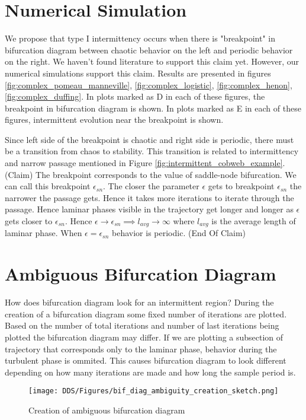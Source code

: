 \section{Numerical Simulation}
We propose that type I intermittency occurs when there is "breakpoint" in bifurcation diagram between chaotic behavior on the left and periodic behavior on the right.
We haven't found literature to support this claim yet.
However, our numerical simulations support this claim.
Results are presented in figures \ref{fig:complex_pomeau_manneville}, \ref{fig:complex_logistic}, \ref{fig:complex_henon}, \ref{fig:complex_duffing}.
In plots marked as D in each of these figures, the breakpoint in bifurcation diagram is shown.
In plots marked as E in each of these figures, intermittent evolution near the breakpoint is shown.
\par
Since left side of the breakpoint is chaotic and right side is periodic, there must be a transition from chaos to stability.
This transition is related to intermittency and narrow passage mentioned in Figure \ref{fig:intermittent_cobweb_example}.
(Claim) The breakpoint corresponds to the value of saddle-node bifurcation.
We can call this breakpoint $\epsilon_{sn}$.
The closer the parameter $\epsilon$ gets to breakpoint $\epsilon_{sn}$ the narrower the passage gets.
Hence it takes more iterations to iterate through the passage.
Hence laminar phases visible in the trajectory get longer and longer as $\epsilon$ gets closer to $\epsilon_{sn}$.
Hence $\epsilon \rightarrow \epsilon_{sn} \implies l_{avg} \rightarrow \infty$ where $l_{avg}$ is the average length of laminar phase.
When $\epsilon = \epsilon_{sn}$ behavior is periodic.
(End Of Claim)

\section{Ambiguous Bifurcation Diagram}
How does bifurcation diagram look for an intermittent region?
During the creation of a bifurcation diagram some fixed number of iterations are plotted.
Based on the number of total iterations and number of last iterations being plotted the bifurcation diagram may differ.
If we are plotting a subsection of trajectory that corresponds only to the laminar phase, behavior during the turbulent phase is ommited.
This causes bifurcation diagram to look different depending on how many iterations are made and how long the sample period is.
\par
\begin{figure}[!h]
    \centering
    \texttt{[image: DDS/Figures/bif\_diag\_ambiguity\_creation\_sketch.png]}
    \caption{Creation of ambiguous bifurcation diagram}
    \label{fig:ambiguous_bif_diag}
\end{figure}

